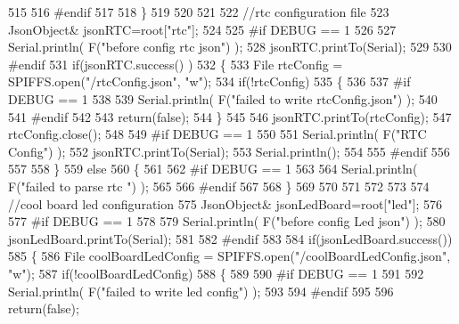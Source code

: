 \begin{DoxyCode}
515     
516 \textcolor{preprocessor}{    #endif}
517 
518     \}
519     
520     
521     
522     \textcolor{comment}{//rtc configuration file}
523         JsonObject& jsonRTC=root[\textcolor{stringliteral}{"rtc"}];
524 
525 \textcolor{preprocessor}{#if DEBUG == 1 }
526     
527     Serial.println( F(\textcolor{stringliteral}{"before config rtc json"}) );
528     jsonRTC.printTo(Serial);
529 
530 \textcolor{preprocessor}{#endif}
531     \textcolor{keywordflow}{if}(jsonRTC.success() )
532     \{
533         File rtcConfig = SPIFFS.open(\textcolor{stringliteral}{"/rtcConfig.json"}, \textcolor{stringliteral}{"w"});   
534         \textcolor{keywordflow}{if}(!rtcConfig)
535         \{
536         
537 \textcolor{preprocessor}{        #if DEBUG == 1 }
538 
539             Serial.println( F(\textcolor{stringliteral}{"failed to write rtcConfig.json"}) );
540 
541 \textcolor{preprocessor}{        #endif}
542 
543             \textcolor{keywordflow}{return}(\textcolor{keyword}{false});
544         \}
545 
546         jsonRTC.printTo(rtcConfig);
547         rtcConfig.close();
548 
549 \textcolor{preprocessor}{    #if DEBUG == 1 }
550 
551         Serial.println( F(\textcolor{stringliteral}{"RTC Config"}) );
552         jsonRTC.printTo(Serial);
553         Serial.println();
554     
555 \textcolor{preprocessor}{    #endif}
556 
557     
558     \}
559     \textcolor{keywordflow}{else}
560     \{
561     
562 \textcolor{preprocessor}{    #if DEBUG == 1 }
563 
564         Serial.println( F(\textcolor{stringliteral}{"failed to parse rtc "}) );
565     
566 \textcolor{preprocessor}{    #endif}
567 
568     \}
569 
570     
571     
572     
573     
574         \textcolor{comment}{//cool board led configuration}
575         JsonObject& jsonLedBoard=root[\textcolor{stringliteral}{"led"}];
576     
577 \textcolor{preprocessor}{#if DEBUG == 1 }
578 
579     Serial.println( F(\textcolor{stringliteral}{"before config Led json"}) );
580     jsonLedBoard.printTo(Serial);
581 
582 \textcolor{preprocessor}{#endif}
583 
584     \textcolor{keywordflow}{if}(jsonLedBoard.success())
585     \{   
586         File coolBoardLedConfig = SPIFFS.open(\textcolor{stringliteral}{"/coolBoardLedConfig.json"}, \textcolor{stringliteral}{"w"}); 
587         \textcolor{keywordflow}{if}(!coolBoardLedConfig)
588         \{
589         
590 \textcolor{preprocessor}{        #if DEBUG == 1 }
591         
592             Serial.println( F(\textcolor{stringliteral}{"failed to write led config"}) );
593         
594 \textcolor{preprocessor}{        #endif}
595 
596             \textcolor{keywordflow}{return}(\textcolor{keyword}{false});

\end{DoxyCode}

